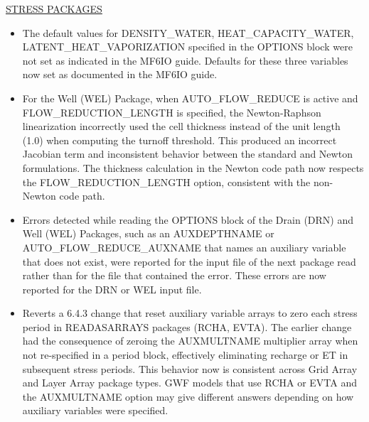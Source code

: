 \underline{STRESS PACKAGES}
\begin{itemize}
\item The default values for DENSITY\_WATER, HEAT\_CAPACITY\_WATER, LATENT\_HEAT\_VAPORIZATION specified in the OPTIONS block were not set as indicated in the MF6IO guide.  Defaults for these three variables now set as documented in the MF6IO guide.
\item For the Well (WEL) Package, when AUTO\_FLOW\_REDUCE is active and FLOW\_REDUCTION\_LENGTH is specified, the Newton-Raphson linearization incorrectly used the cell thickness instead of the unit length (1.0) when computing the turnoff threshold. This produced an incorrect Jacobian term and inconsistent behavior between the standard and Newton formulations. The thickness calculation in the Newton code path now respects the FLOW\_REDUCTION\_LENGTH option, consistent with the non-Newton code path.
\item Errors detected while reading the OPTIONS block of the Drain (DRN) and Well (WEL) Packages, such as an AUXDEPTHNAME or AUTO\_FLOW\_REDUCE\_AUXNAME that names an auxiliary variable that does not exist, were reported for the input file of the next package read rather than for the file that contained the error. These errors are now reported for the DRN or WEL input file.
\item Reverts a 6.4.3 change that reset auxiliary variable arrays to zero each stress period in READASARRAYS packages (RCHA, EVTA). The earlier change had the consequence of zeroing the AUXMULTNAME multiplier array when not re-specified in a period block, effectively eliminating recharge or ET in subsequent stress periods. This behavior now is consistent across Grid Array and Layer Array package types. GWF models that use RCHA or EVTA and the AUXMULTNAME option may give different answers depending on how auxiliary variables were specified.
\end{itemize}
